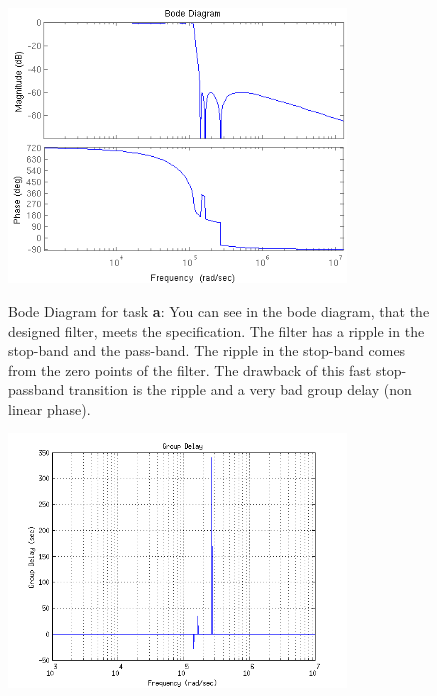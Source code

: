 \begin{figure}[h!]
 \centering
 \includegraphics[width=0.8\textwidth]{./pics/2_a_bode.png}
 \label{fig:2_a_bode}
 \caption{Bode Diagram for task \textbf{a}: You can see in the bode diagram, that the designed filter, meets the specification.
 The filter has a ripple in the stop-band and the pass-band. The ripple in the stop-band comes from
 the zero points of the filter. The drawback of this fast stop-passband transition is the ripple
 and a very bad group delay (non linear phase).}
\end{figure}

\begin{figure}[h!]
 \centering
 \includegraphics[width=0.8\textwidth]{./pics/2_a_grpdelay_2.png}
 \label{fig:2_a_grpdelay}
\end{figure}

